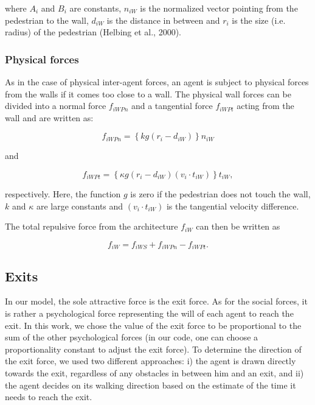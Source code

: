 \documentclass[11pt]{article}
\begin{document}
where $A_i$ and $B_i$ are constants, $n_{iW}$ is the normalized vector pointing from the pedestrian to the wall, $d_{iW}$ is the distance in between and $r_i$ is the size (i.e. radius) of the pedestrian (Helbing et al., 2000).

\subsubsection{Physical forces}
As in the case of physical inter-agent forces, an agent is subject to physical forces from the walls if it comes too close to a wall. The physical wall forces can be divided into a normal force $f_{iWPn}$ and a tangential force $f_{iWPt}$ acting from the wall and are written as:

\begin{equation}
	{f_{iWPn}} = \left\{ {kg\left( {{r_i} - {d_{iW}}} \right)} \right\}{n_{iW}}
	\label{eq:fiWPn}
\end{equation}

and

\begin{equation}
	{f_{iWPt}} = \left\{ {\kappa g\left( {{r_i} - {d_{iW}}} \right)\left( {{v_i} \cdot {t_{iW}}} \right)} \right\}{t_{iW}} ,
	\label{eq:fiWPt}
\end{equation}

respectively. Here, the function $g$ is zero if the pedestrian does not touch the wall, $k$ and $\kappa$ are large constants and $(v_i \cdot t_{iW})$ is the tangential velocity difference.

The total repulsive force from the architecture $f_{iW}$ can then be written as

\begin{equation}
	{f_{iW}} = {f_{iWS}} + {f_{iWPn}} - {f_{iWPt}} .
	\label{eq:fiW}
\end{equation}



\subsection{Exits}
\label{sec:Exits1}

In our model, the sole attractive force is the exit force. As for the social forces, it is rather a psychological force representing the will of each agent to reach the exit. In this work, we chose the value of the exit force to be proportional to the sum of the other psychological forces (in our code, one can choose a proportionality constant to adjust the exit force). To determine the direction of the exit force, we used two different approaches: i) the agent is drawn directly towards the exit, regardless of any obstacles in between him and an exit, and ii) the agent decides on its walking direction based on the estimate of the time it needs to reach the exit.
\end{document}
